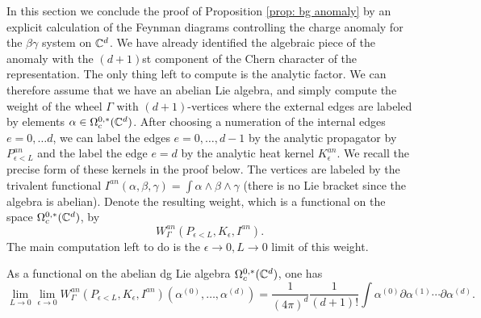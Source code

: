 In this section we conclude the proof of Proposition \ref{prop: bg anomaly} by an explicit calculation of the Feynman diagrams controlling the charge anomaly for the $\beta\gamma$ system on $\mathbb C^d$. 
We have already identified the algebraic piece of the anomaly with the $(d+1)$st component of the Chern character of the representation. 
The only thing left to compute is the analytic factor. 
We can therefore assume that we have an abelian Lie algebra, and simply compute the weight of the wheel $\Gamma$ with $(d+1)$-vertices where the external edges are labeled by elements $\alpha \in \Omega_c^{0,*}(\mathbb C^d)$.
After choosing a numeration of the internal edges $e = 0,\ldots d$, we can label the edges $e = 0,\ldots, d-1$ by the analytic propagator by $P^{an}_{\epsilon<L}$ and the label the edge $e = d$ by the analytic heat kernel $K_\epsilon^{an}$. 
We recall the precise form of these kernels in the proof below. 
The vertices are labeled by the trivalent functional $I^{an} (\alpha, \beta,\gamma) = \int \alpha \wedge \beta \wedge \gamma$ (there is no Lie bracket since the algebra is abelian). 
Denote the resulting weight, which is a functional on the space $\Omega^{0,*}_c(\mathbb C^d)$, by
\[
W^{an}_{\Gamma}(P_{\epsilon < L}, K_\epsilon, I^{an}) .
\]
The main computation left to do is the $\epsilon \to 0, L \to 0$ limit of this weight.

\begin{lem} 
As a functional on the abelian dg Lie algebra $\Omega_c^{0,*}(\mathbb C^d)$, one has
\[
\lim_{L \to 0} \lim_{\epsilon \to 0} W^{an}_{\Gamma}(P_{\epsilon < L}, K_\epsilon, I^{an})(\alpha^{(0)},\ldots, \alpha^{(d)}) = \frac{1}{(4 \pi)^d} \frac{1}{(d+1)!} \int \alpha^{(0)} \partial \alpha^{(1)} \cdots \partial \alpha^{(d)}  .
\]
\end{lem}

